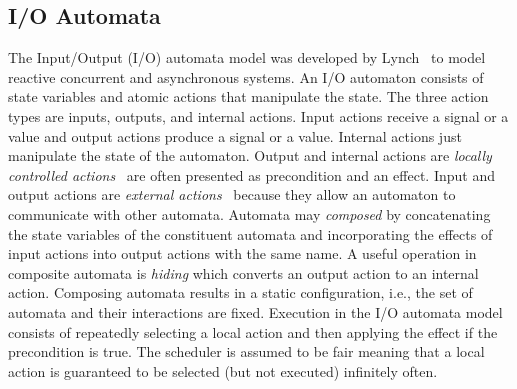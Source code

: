 

\subsection{I/O Automata}

The Input/Output (I/O) automata model was developed by Lynch~\cite{distributed_algorithms} to model reactive concurrent and asynchronous systems.
An I/O automaton consists of state variables and atomic actions that manipulate the state.
The three action types are inputs, outputs, and internal actions.
Input actions receive a signal or a value and output actions produce a signal or a value.
Internal actions just manipulate the state of the automaton.
Output and internal actions are \emph{locally controlled actions}~\cite{distributed_algorithms} are often presented as precondition and an effect.
Input and output actions are \emph{external actions}~\cite{distributed_algorithms} because they allow an automaton to communicate with other automata.
Automata may \emph{composed} by concatenating the state variables of the constituent automata and incorporating the effects of input actions into output actions with the same name.
A useful operation in composite automata is \emph{hiding} which converts an output action to an internal action.
Composing automata results in a static configuration, i.e., the set of automata and their interactions are fixed.
Execution in the I/O automata model consists of repeatedly selecting a local action and then applying the effect if the precondition is true.
The scheduler is assumed to be fair meaning that a local action is guaranteed to be selected (but not executed) infinitely often.

